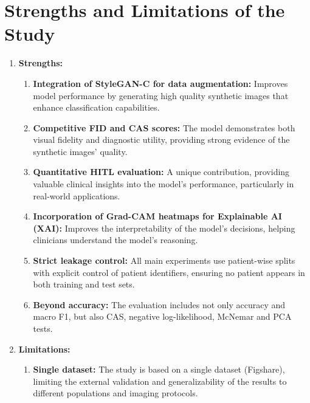 \section{Strengths and Limitations of the Study}
\begin{enumerate}
    \item \textbf{Strengths:}
    \begin{enumerate}
    
        \item \textbf{Integration of StyleGAN-C for data augmentation:} Improves model performance by generating high quality synthetic images that enhance classification capabilities.
        
        \item \textbf{Competitive FID and CAS scores:} The model demonstrates both visual fidelity and diagnostic utility, providing strong evidence of the synthetic images' quality.
        
        \item \textbf{Quantitative HITL evaluation:} A unique contribution, providing valuable clinical insights into the model’s performance, particularly in real-world applications.
        
        \item \textbf{Incorporation of Grad-CAM heatmaps for Explainable AI (XAI):} Improves the interpretability of the model’s decisions, helping clinicians understand the model’s reasoning.

        
        \item \textbf{Strict leakage control:} All main experiments use patient-wise splits with explicit control of patient identifiers, ensuring no patient appears in both training and test sets. 

        
        \item \textbf{Beyond accuracy:} The evaluation includes not only accuracy and macro F1, but also CAS, negative log-likelihood, McNemar and PCA tests.
    \end{enumerate}
    
    \item \textbf{Limitations:}
    
    \begin{enumerate}
        \item \textbf{Single dataset:} The study is based on a single dataset (Figshare), limiting the external validation and generalizability of the results to different populations and imaging protocols.


\end{enumerate}
\end{enumerate}
